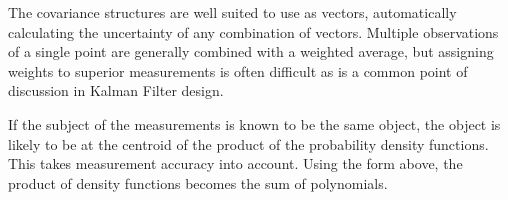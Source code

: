 \documentclass[a4paper, 11pt, titlepage]{article}
\newcounter{subsubsubsection}[subsubsection]
\begin{document}
      \label{sec:covarInter}
        The covariance structures are well suited to use as vectors, automatically calculating the uncertainty of any combination of vectors. 
        Multiple observations of a single point are generally combined with a weighted average, but assigning weights to superior measurements is often difficult as is a common point of discussion in Kalman Filter design.
        
        If the subject of the measurements is known to be the same object, the object is likely to be at the centroid of the product of the probability density functions.  This takes measurement accuracy into account.
        Using the form above, the product of density functions becomes the sum of polynomials.
\end{document}
